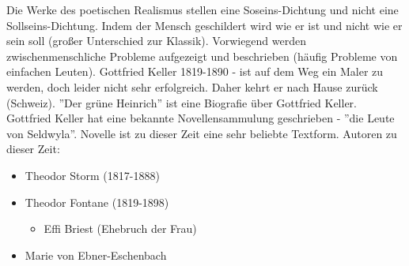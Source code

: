 \documentclass[12pt,a4paper]{article}
\begin{document}
Die Werke des poetischen Realismus stellen eine Soseins-Dichtung und nicht eine Sollseins-Dichtung. Indem der Mensch geschildert wird wie er ist und nicht wie er sein soll (großer Unterschied zur Klassik). Vorwiegend werden zwischenmenschliche Probleme aufgezeigt und beschrieben (häufig Probleme von einfachen Leuten).
\newline
\newline
Gottfried Keller 1819-1890 - ist auf dem Weg ein Maler zu werden, doch leider nicht sehr erfolgreich. Daher kehrt er  nach Hause zurück (Schweiz). ''Der grüne Heinrich'' ist eine Biografie über Gottfried Keller. Gottfried Keller hat eine bekannte Novellensammulung geschrieben - ''die Leute von Seldwyla''.
\newline
\newline
Novelle ist zu dieser Zeit eine sehr beliebte Textform.
\newline
\newline
Autoren zu dieser Zeit:
\begin{itemize}
\item Theodor Storm (1817-1888)
\item Theodor Fontane (1819-1898)
	\begin{itemize}
	\item Effi Briest (Ehebruch der Frau)
	\end{itemize}
\item Marie von Ebner-Eschenbach
\end{itemize}

	
\end{document}
